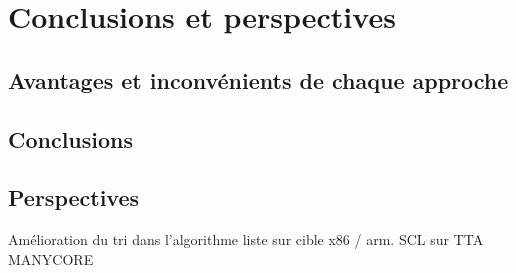 \chapter*{Conclusions et perspectives}

\section*{Avantages et inconvénients de chaque approche}
\section*{Conclusions}
\section*{Perspectives}

Amélioration du tri dans l'algorithme liste sur cible x86 / arm.
SCL sur TTA
MANYCORE
